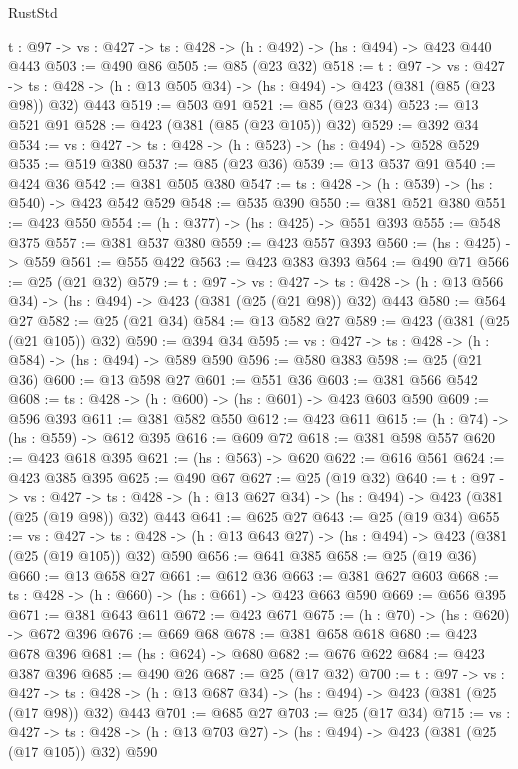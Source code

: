 \begin{lexlean}{RustStd}
\begin{coremodule}
{\begin{coremodule}
{  {t : @97} -> {vs : @427} -> {ts : @428} -> (h : @492) -> (hs : @494) -> @423 @440 @443
@503 := @490 @86
@505 := @85 (@23 @32)
@518 := {t : @97} ->
  {vs : @427} ->
  {ts : @428} -> (h : @13 @505 @34) -> (hs : @494) -> @423 (@381 (@85 (@23 @98)) @32) @443
@519 := @503 @91
@521 := @85 (@23 @34)
@523 := @13 @521 @91
@528 := @423 (@381 (@85 (@23 @105)) @32)
@529 := @392 @34
@534 := {vs : @427} -> {ts : @428} -> (h : @523) -> (hs : @494) -> @528 @529
@535 := @519 @380
@537 := @85 (@23 @36)
@539 := @13 @537 @91
@540 := @424 @36
@542 := @381 @505 @380
@547 := {ts : @428} -> (h : @539) -> (hs : @540) -> @423 @542 @529
@548 := @535 @390
@550 := @381 @521 @380
@551 := @423 @550
@554 := (h : @377) -> (hs : @425) -> @551 @393
@555 := @548 @375
@557 := @381 @537 @380
@559 := @423 @557 @393
@560 := (hs : @425) -> @559
@561 := @555 @422
@563 := @423 @383 @393
@564 := @490 @71
@566 := @25 (@21 @32)
@579 := {t : @97} ->
  {vs : @427} ->
  {ts : @428} -> (h : @13 @566 @34) -> (hs : @494) -> @423 (@381 (@25 (@21 @98)) @32) @443
@580 := @564 @27
@582 := @25 (@21 @34)
@584 := @13 @582 @27
@589 := @423 (@381 (@25 (@21 @105)) @32)
@590 := @394 @34
@595 := {vs : @427} -> {ts : @428} -> (h : @584) -> (hs : @494) -> @589 @590
@596 := @580 @383
@598 := @25 (@21 @36)
@600 := @13 @598 @27
@601 := @551 @36
@603 := @381 @566 @542
@608 := {ts : @428} -> (h : @600) -> (hs : @601) -> @423 @603 @590
@609 := @596 @393
@611 := @381 @582 @550
@612 := @423 @611
@615 := (h : @74) -> (hs : @559) -> @612 @395
@616 := @609 @72
@618 := @381 @598 @557
@620 := @423 @618 @395
@621 := (hs : @563) -> @620
@622 := @616 @561
@624 := @423 @385 @395
@625 := @490 @67
@627 := @25 (@19 @32)
@640 := {t : @97} ->
  {vs : @427} ->
  {ts : @428} -> (h : @13 @627 @34) -> (hs : @494) -> @423 (@381 (@25 (@19 @98)) @32) @443
@641 := @625 @27
@643 := @25 (@19 @34)
@655 := {vs : @427} ->
  {ts : @428} -> (h : @13 @643 @27) -> (hs : @494) -> @423 (@381 (@25 (@19 @105)) @32) @590
@656 := @641 @385
@658 := @25 (@19 @36)
@660 := @13 @658 @27
@661 := @612 @36
@663 := @381 @627 @603
@668 := {ts : @428} -> (h : @660) -> (hs : @661) -> @423 @663 @590
@669 := @656 @395
@671 := @381 @643 @611
@672 := @423 @671
@675 := (h : @70) -> (hs : @620) -> @672 @396
@676 := @669 @68
@678 := @381 @658 @618
@680 := @423 @678 @396
@681 := (hs : @624) -> @680
@682 := @676 @622
@684 := @423 @387 @396
@685 := @490 @26
@687 := @25 (@17 @32)
@700 := {t : @97} ->
  {vs : @427} ->
  {ts : @428} -> (h : @13 @687 @34) -> (hs : @494) -> @423 (@381 (@25 (@17 @98)) @32) @443
@701 := @685 @27
@703 := @25 (@17 @34)
@715 := {vs : @427} ->
  {ts : @428} -> (h : @13 @703 @27) -> (hs : @494) -> @423 (@381 (@25 (@17 @105)) @32) @590
}
\end{coremodule}}
\end{coremodule}
\end{lexlean}
